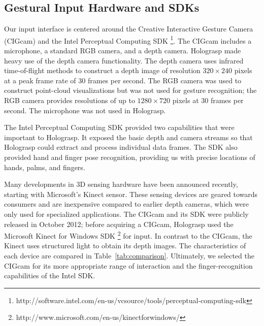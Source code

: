 \documentclass[pageno]{jpaper}
\begin{document}
\subsection{Gestural Input Hardware and SDKs}
Our input interface is centered around the Creative Interactive Gesture Camera (CIGcam) and the Intel Perceptual Computing SDK
\footnote{http://software.intel.com/en-us/vcsource/tools/perceptual-computing-sdk}.
The CIGcam includes a microphone, a standard RGB camera, and a depth camera. Holograsp made heavy use of the depth camera functionality.
The depth camera uses infrared time-of-flight methods to construct a depth image of resolution $320 \times 240$ pixels at a peak frame
rate of 30 frames per second. The RGB camera was used to construct point-cloud visualizations but was not used for gesture recognition;
the RGB camera provides resolutions of up to $1280 \times 720$ pixels at 30 frames per second. The microphone was not used in Holograsp.

The Intel Perceptual Computing SDK provided two capabilities that were important to Holograsp. It exposed the basic depth and 
camera streams so that Holograsp could extract and process individual data frames. The SDK also provided
hand and finger pose recognition, providing us with precise locations of hands, palms, and fingers.

Many developments in 3D sensing hardware have been announced recently, starting with Microsoft's Kinect sensor. These sensing
devices are geared towards consumers and are inexpensive compared to earlier depth cameras, which were only used for specialized applications.
The CIGcam and its SDK were publicly released in October 2012; before acquiring a CIGcam, Holograsp used the Microsoft Kinect for Windows SDK
\footnote{http://www.microsoft.com/en-us/kinectforwindows/} for input. In contrast to the CIGcam, the Kinect uses structured light
to obtain its depth images. The characteristics of each device are compared in Table~\ref{tab:comparison}.
Ultimately, we selected the CIGcam for its more appropriate range of interaction and the finger-recognition
capabilities of the Intel SDK.
\end{document}

